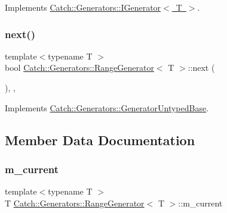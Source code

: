 Implements \mbox{\hyperlink{struct_catch_1_1_generators_1_1_i_generator_a525d381fc9249a885b075a0632a8579a}{Catch\+::\+Generators\+::\+I\+Generator$<$ T $>$}}.

\mbox{\label{class_catch_1_1_generators_1_1_range_generator_a4e6b2038832f09724d5a4355b4691259}} 
\subsubsection{\texorpdfstring{next()}{next()}}
{\footnotesize\ttfamily template$<$typename T $>$ \\
bool \mbox{\hyperlink{class_catch_1_1_generators_1_1_range_generator}{Catch\+::\+Generators\+::\+Range\+Generator}}$<$ T $>$\+::next (\begin{DoxyParamCaption}{ }\end{DoxyParamCaption})\hspace{0.3cm}{\ttfamily [inline]}, {\ttfamily [override]}, {\ttfamily [virtual]}}



Implements \mbox{\hyperlink{class_catch_1_1_generators_1_1_generator_untyped_base_aeed3c0cd6233c5f553549e453b8d6638}{Catch\+::\+Generators\+::\+Generator\+Untyped\+Base}}.



\subsection{Member Data Documentation}
\mbox{\label{class_catch_1_1_generators_1_1_range_generator_af2be334be7dc9be55bcb75b2609dea64}} 
\subsubsection{\texorpdfstring{m\_current}{m\_current}}
{\footnotesize\ttfamily template$<$typename T $>$ \\
T \mbox{\hyperlink{class_catch_1_1_generators_1_1_range_generator}{Catch\+::\+Generators\+::\+Range\+Generator}}$<$ T $>$\+::m\+\_\+current\hspace{0.3cm}{\ttfamily [private]}}

